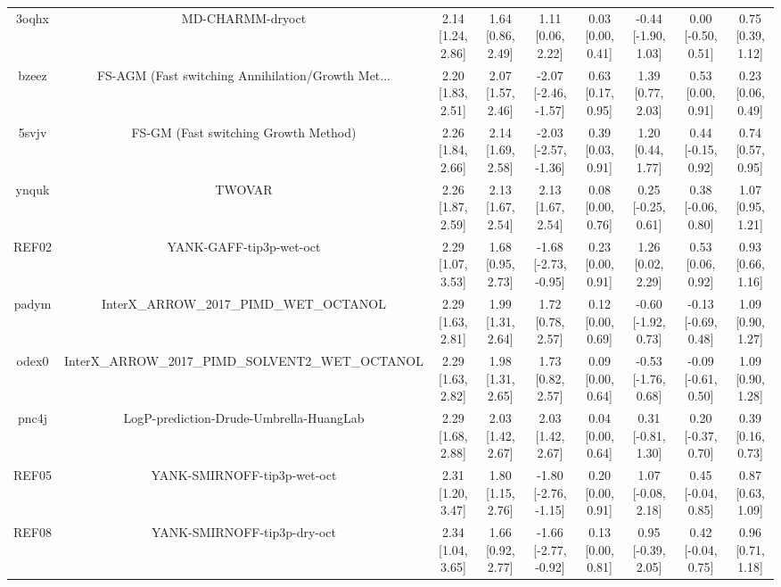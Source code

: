 \documentclass{article}
\begin{document}
\begin{center}
\begin{longtable}{|ccccccccc|}
 3oqhx &                                   MD-CHARMM-dryoct &  2.14 [1.24, 2.86] &  1.64 [0.86, 2.49] &     1.11 [0.06, 2.22] &  0.03 [0.00, 0.41] &  -0.44 [-1.90, 1.03] &   0.00 [-0.50, 0.51] &     0.75 [0.39, 1.12] \\
 bzeez &  FS-AGM (Fast switching Annihilation/Growth Met... &  2.20 [1.83, 2.51] &  2.07 [1.57, 2.46] &  -2.07 [-2.46, -1.57] &  0.63 [0.17, 0.95] &    1.39 [0.77, 2.03] &    0.53 [0.00, 0.91] &     0.23 [0.06, 0.49] \\
 5svjv &               FS-GM (Fast switching Growth Method) &  2.26 [1.84, 2.66] &  2.14 [1.69, 2.58] &  -2.03 [-2.57, -1.36] &  0.39 [0.03, 0.91] &    1.20 [0.44, 1.77] &   0.44 [-0.15, 0.92] &     0.74 [0.57, 0.95] \\
 ynquk &                                             TWOVAR &  2.26 [1.87, 2.59] &  2.13 [1.67, 2.54] &     2.13 [1.67, 2.54] &  0.08 [0.00, 0.76] &   0.25 [-0.25, 0.61] &   0.38 [-0.06, 0.80] &     1.07 [0.95, 1.21] \\
 REF02 &                            YANK-GAFF-tip3p-wet-oct &  2.29 [1.07, 3.53] &  1.68 [0.95, 2.73] &  -1.68 [-2.73, -0.95] &  0.23 [0.00, 0.91] &    1.26 [0.02, 2.29] &    0.53 [0.06, 0.92] &     0.93 [0.66, 1.16] \\
 padym &            InterX\_ARROW\_2017\_PIMD\_WET\_OCTANOL &  2.29 [1.63, 2.81] &  1.99 [1.31, 2.64] &     1.72 [0.78, 2.57] &  0.12 [0.00, 0.69] &  -0.60 [-1.92, 0.73] &  -0.13 [-0.69, 0.48] &     1.09 [0.90, 1.27] \\
 odex0 &  InterX\_ARROW\_2017\_PIMD\_SOLVENT2\_WET\_OCTANOL &  2.29 [1.63, 2.82] &  1.98 [1.31, 2.65] &     1.73 [0.82, 2.57] &  0.09 [0.00, 0.64] &  -0.53 [-1.76, 0.68] &  -0.09 [-0.61, 0.50] &     1.09 [0.90, 1.28] \\
 pnc4j &            LogP-prediction-Drude-Umbrella-HuangLab &  2.29 [1.68, 2.88] &  2.03 [1.42, 2.67] &     2.03 [1.42, 2.67] &  0.04 [0.00, 0.64] &   0.31 [-0.81, 1.30] &   0.20 [-0.37, 0.70] &     0.39 [0.16, 0.73] \\
 REF05 &                        YANK-SMIRNOFF-tip3p-wet-oct &  2.31 [1.20, 3.47] &  1.80 [1.15, 2.76] &  -1.80 [-2.76, -1.15] &  0.20 [0.00, 0.91] &   1.07 [-0.08, 2.18] &   0.45 [-0.04, 0.85] &     0.87 [0.63, 1.09] \\
 REF08 &                        YANK-SMIRNOFF-tip3p-dry-oct &  2.34 [1.04, 3.65] &  1.66 [0.92, 2.77] &  -1.66 [-2.77, -0.92] &  0.13 [0.00, 0.81] &   0.95 [-0.39, 2.05] &   0.42 [-0.04, 0.75] &     0.96 [0.71, 1.18] \\

\end{longtable}
\end{center}
\end{document}

